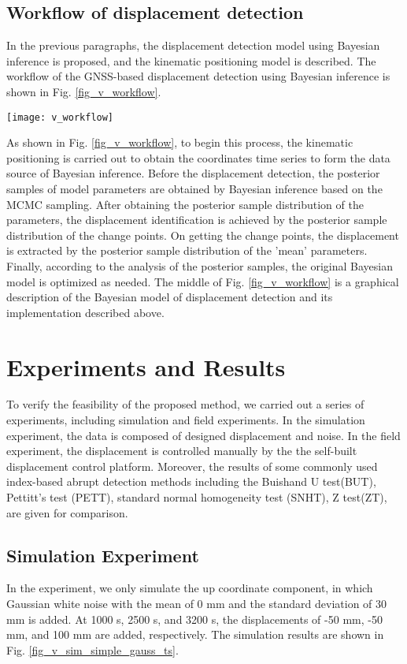 \documentclass[final,3p,times]{elsarticle}
\begin{document}
	\subsection{Workflow of displacement detection }  
	In the previous paragraphs, the displacement detection model using Bayesian inference is proposed, and the \textcolor{r_s}{ kinematic positioning model is described.}
	The workflow of the GNSS-based displacement detection using Bayesian inference is shown in Fig. \ref{fig_v_workflow}.
	\begin{figure*}[htpb]
		\centering
		\texttt{[image: v\_workflow]}
		\caption{Bayesian model for displacement detection.}
		\label{fig_v_workflow}
	\end{figure*} 
	
	As shown in Fig. \ref{fig_v_workflow}, to begin this process, the kinematic positioning is carried out to obtain the coordinates time series to form the data source of Bayesian inference. 
	Before the displacement detection,  the posterior samples of model parameters are obtained by Bayesian inference based on the MCMC sampling.
	After obtaining the posterior sample distribution of the parameters, the displacement identification is achieved by the posterior sample distribution of the change points.
	On getting the change points, the displacement is extracted by the posterior sample distribution of  the 'mean' parameters.
	Finally, according to the analysis of the posterior samples, the original Bayesian model is optimized as needed.
	The middle of Fig. \ref{fig_v_workflow} is a graphical description of the Bayesian model of displacement detection and its implementation described above.
	
	\section{Experiments and Results}
	\label{exp}
	To verify the feasibility of the proposed method, we carried out a series of experiments, including simulation and field experiments. 
	In the simulation experiment, the data is composed of designed displacement and noise.
	In the field experiment, the displacement is controlled manually by the  the self-built displacement control platform.
	Moreover, the results of some commonly used index-based abrupt detection methods including the Buishand U test(BUT), Pettitt’s test (PETT), standard normal homogeneity test (SNHT), Z test(ZT), are given for comparison.
	
	\subsection{Simulation Experiment}
	In the experiment, we only simulate the up coordinate component, in which Gaussian white noise with the mean of 0 mm and the standard deviation of 30 mm is added.
	At 1000 s, 2500 s, and 3200 s, the displacements of -50 mm, -50 mm, and 100 mm are added, respectively. 
	The simulation results are shown in Fig. \ref{fig_v_sim_simple_gauss_ts}.
	
\end{document}
